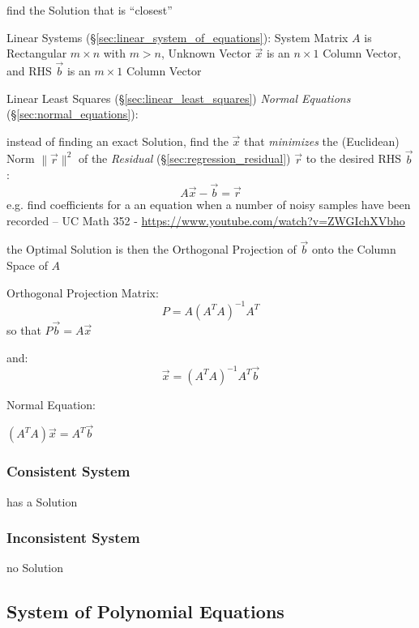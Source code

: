 find the Solution that is ``closest''

Linear Systems (\S\ref{sec:linear_system_of_equations}): System Matrix $A$ is
Rectangular $m \times n$ with $m > n$, Unknown Vector $\vec{x}$ is an $n \times
1$ Column Vector, and RHS $\vec{b}$ is an $m \times 1$ Column Vector

Linear Least Squares (\S\ref{sec:linear_least_squares}) \emph{Normal Equations}
(\S\ref{sec:normal_equations}):

instead of finding an exact Solution, find the $\vec{x}$ that \emph{minimizes}
the (Euclidean) Norm $\|\vec{r}\|^2$ of the \emph{Residual}
(\S\ref{sec:regression_residual}) $\vec{r}$ to the desired RHS $\vec{b}$:
\[
  A\vec{x} - \vec{b} = \vec{r}
\]
e.g. find coefficients for a an equation when a number of noisy samples have
been recorded -- UC Math 352 - \url{https://www.youtube.com/watch?v=ZWGIchXVbho}

the Optimal Solution is then the Orthogonal Projection of $\vec{b}$ onto the
Column Space of $A$

Orthogonal Projection Matrix:
\[
  P = A(A^TA)^{-1}A^T
\]
so that $P\vec{b} = A\vec{x}$

and:
\[
  \vec{x} = (A^TA)^{-1}A^T\vec{b}
\]

Normal Equation:

$(A^TA)\vec{x} = A^T\vec{b}$



\subsubsection{Consistent System}\label{sec:consistent_system}

has a Solution



\subsubsection{Inconsistent System}\label{sec:inconsistent_system}

no Solution



\subsection{System of Polynomial Equations}
\label{sec:system_of_polynomials}

